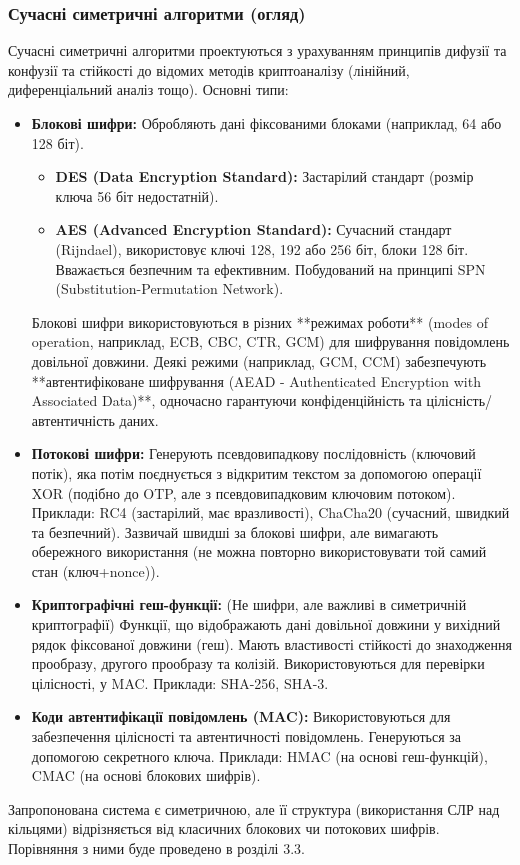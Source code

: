 \documentclass[a4paper,12pt]{article}
\begin{document}
    \subsubsection{Сучасні симетричні алгоритми (огляд)} %
    Сучасні симетричні алгоритми проектуються з урахуванням принципів дифузії та конфузії та стійкості до відомих методів криптоаналізу (лінійний, диференціальний аналіз тощо). Основні типи:
    \begin{itemize}
        \item \textbf{Блокові шифри:} Обробляють дані фіксованими блоками (наприклад, 64 або 128 біт).
        \begin{itemize}
            \item \textbf{DES (Data Encryption Standard):} Застарілий стандарт (розмір ключа 56 біт недостатній).
            \item \textbf{AES (Advanced Encryption Standard):} Сучасний стандарт (Rijndael), використовує ключі 128, 192 або 256 біт, блоки 128 біт. Вважається безпечним та ефективним. Побудований на принципі SPN (Substitution-Permutation Network).
        \end{itemize}
        Блокові шифри використовуються в різних **режимах роботи** (modes of operation, наприклад, ECB, CBC, CTR, GCM) для шифрування повідомлень довільної довжини. Деякі режими (наприклад, GCM, CCM) забезпечують **автентифіковане шифрування (AEAD - Authenticated Encryption with Associated Data)**, одночасно гарантуючи конфіденційність та цілісність/автентичність даних.
        \item \textbf{Потокові шифри:} Генерують псевдовипадкову послідовність (ключовий потік), яка потім поєднується з відкритим текстом за допомогою операції XOR (подібно до OTP, але з псевдовипадковим ключовим потоком). Приклади: RC4 (застарілий, має вразливості), ChaCha20 (сучасний, швидкий та безпечний). Зазвичай швидші за блокові шифри, але вимагають обережного використання (не можна повторно використовувати той самий стан (ключ+nonce)).
        \item \textbf{Криптографічні геш-функції:} (Не шифри, але важливі в симетричній криптографії) Функції, що відображають дані довільної довжини у вихідний рядок фіксованої довжини (геш). Мають властивості стійкості до знаходження прообразу, другого прообразу та колізій. Використовуються для перевірки цілісності, у MAC. Приклади: SHA-256, SHA-3.
        \item \textbf{Коди автентифікації повідомлень (MAC):} Використовуються для забезпечення цілісності та автентичності повідомлень. Генеруються за допомогою секретного ключа. Приклади: HMAC (на основі геш-функцій), CMAC (на основі блокових шифрів).
    \end{itemize}
    Запропонована система є симетричною, але її структура (використання СЛР над кільцями) відрізняється від класичних блокових чи потокових шифрів. Порівняння з ними буде проведено в розділі 3.3.
\end{document}
